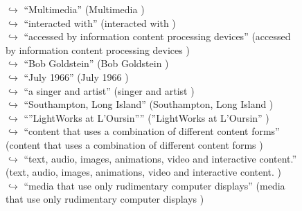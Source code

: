 \documentclass[11pt,a4paper, onecolumn]{article}
\begin{document}
\begin{figure}[t] \small \begin{tcolorbox}[boxsep=0pt,left=5pt,right=0pt,top=2pt,colback = yellow!5] \begin{dialogue}
 \small 
\colorbox{pink!25}{$\hookrightarrow$}
{ ``Multimedia'' (Multimedia ) }
\\
\colorbox{pink!25}{$\hookrightarrow$}
{ ``interacted with'' (interacted with ) }
\\
\colorbox{pink!25}{$\hookrightarrow$}
{ ``accessed by information content processing devices'' (accessed by information content processing devices ) }
\\
\colorbox{pink!25}{$\hookrightarrow$}
{ ``Bob Goldstein'' (Bob Goldstein ) }
\\
\colorbox{pink!25}{$\hookrightarrow$}
{ ``July 1966'' (July 1966 ) }
\\
\colorbox{pink!25}{$\hookrightarrow$}
{ ``a singer and artist'' (singer and artist ) }
\\
\colorbox{pink!25}{$\hookrightarrow$}
{ ``Southampton, Long Island'' (Southampton, Long Island ) }
\\
\colorbox{pink!25}{$\hookrightarrow$}
{ ``''LightWorks at L'Oursin'''' (''LightWorks at L'Oursin'' ) }
\\
\colorbox{pink!25}{$\hookrightarrow$}
{ ``content that uses a combination of different content forms'' (content that uses a combination of different content forms ) }
\\
\colorbox{pink!25}{$\hookrightarrow$}
{ ``text, audio, images, animations, video and interactive content.'' (text, audio, images, animations, video and interactive content. ) }
\\
\colorbox{pink!25}{$\hookrightarrow$}
{ ``media that use only rudimentary computer displays'' (media that use only rudimentary computer displays ) }
\\

\end{dialogue}
\end{tcolorbox}
\end{figure}
\end{document}
